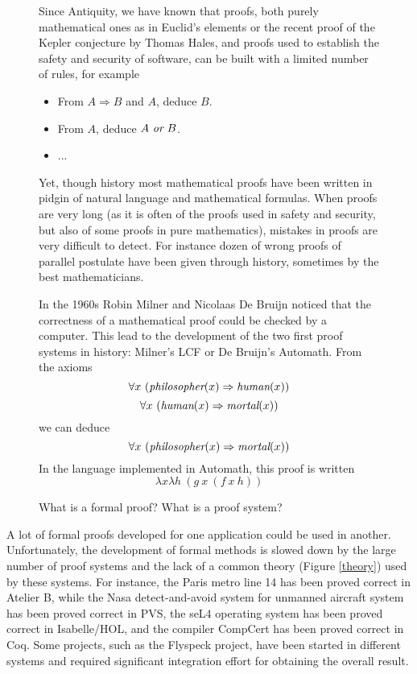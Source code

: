 \begin{figure}
\begin{framed}
Since Antiquity, we have known that
proofs, both purely mathematical ones as in Euclid's elements or the
recent proof of the Kepler conjecture by Thomas Hales, and proofs used
to establish the safety and security of software, can be built with a
limited number of rules, for example
\begin{itemize}
\item From $A \Rightarrow B$ and $A$, deduce $B$.
\item From $A$, deduce $A~\mbox{\it or}~B$.
\item ...
\end{itemize}
Yet, though history most mathematical proofs have been written in
pidgin of natural language and mathematical formulas. When proofs are
very long (as it is often of the proofs used in safety and security, but
also of some proofs in pure mathematics), mistakes in proofs are very
difficult to detect. For instance dozen of wrong proofs of parallel postulate
have been given through history, sometimes by the best mathematicians.

In the 1960s Robin Milner and Nicolaas De Bruijn noticed that the
correctness of a mathematical proof could be checked by a
computer. This lead to the development of the two first
proof systems in history: Milner's {\sc LCF} or De Bruijn's {\sc Automath}.
From the axioms
$$\forall x~(\mbox{\em philosopher}(x) \Rightarrow \mbox{\em human}(x))$$
$$\forall x~(\mbox{\em human}(x) \Rightarrow \mbox{\em mortal}(x))$$
we can deduce
$$\forall x~(\mbox{\em philosopher}(x) \Rightarrow \mbox{\em mortal}(x))$$
In the language implemented in {\sc Automath}, this proof is written
$$\lambda x \lambda h~(g~x~(f~x~h))$$

\caption{What is a formal proof? What is a proof system?\label{formal}}
\end{framed}
\end{figure}

A lot of formal proofs developed for one application could be used in
another.  Unfortunately, the development of formal methods is slowed
down by the large number of proof systems and the lack of a common
theory (Figure \ref{theory}) used by these systems.
For instance, the Paris metro line 14 has been proved correct in {\sc
  Atelier B}, while the Nasa detect-and-avoid system for unmanned
aircraft system has been proved correct in {\sc PVS}, the seL4
operating system has been proved correct in {\sc Isabelle/HOL}, and
the compiler CompCert has been proved correct in {\sc Coq}.  Some
projects, such as the Flyspeck project, have been started in different
systems and required significant integration effort for obtaining the
overall result.

